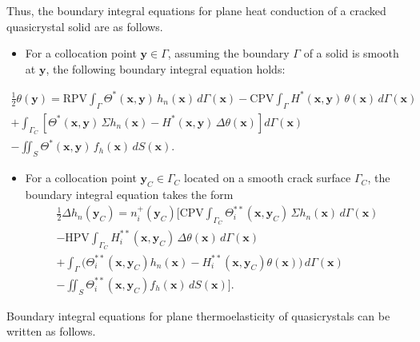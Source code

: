 Thus, the boundary integral equations for plane heat conduction of
a cracked quasicrystal solid are as follows.
\begin{itemize}
	\item For a collocation point $\mathbf{y}\in\Gamma$, assuming the boundary
	$\Gamma$ of a solid is smooth at $\mathbf{y}$, the following boundary
	integral equation holds:
\end{itemize}
\begin{multline}
	\frac{1}{2}\theta(\mathbf{y})
	=
	\mathrm{RPV}\!\int_{\Gamma}
	\Theta^{*}(\mathbf{x},\mathbf{y})\,h_n(\mathbf{x})\,d\Gamma(\mathbf{x})
	-
	\mathrm{CPV}\!\int_{\Gamma}
	H^{*}(\mathbf{x},\mathbf{y})\,\theta(\mathbf{x})\,d\Gamma(\mathbf{x})
	\\
	+
	\int_{\Gamma_C}
	\left[
	\Theta^{*}(\mathbf{x},\mathbf{y})\,\Sigma h_n(\mathbf{x})
	-
	H^{*}(\mathbf{x},\mathbf{y})\,\Delta\theta(\mathbf{x})
	\right] d\Gamma(\mathbf{x})
	\\
	-
	\iint_{S}
	\Theta^{*}(\mathbf{x},\mathbf{y})\,f_h(\mathbf{x})\,dS(\mathbf{x}).
	\label{KushnirEq7}
\end{multline}
\begin{itemize}
	
	\item For a collocation point $\mathbf{y}_{C}\in\Gamma_{C}$ located on
	a smooth crack surface $\Gamma_{C}$, the boundary integral equation
	takes the form
	\begin{multline}
		\frac{1}{2}\Delta h_n(\mathbf{y}_C)
		=
		n_i^{+}(\mathbf{y}_C)
		\bigg[
		\mathrm{CPV}\!\int_{\Gamma_C}
		\Theta_i^{**}(\mathbf{x},\mathbf{y}_C)
		\,\Sigma h_n(\mathbf{x})\,d\Gamma(\mathbf{x})
		\\
		-
		\mathrm{HPV}\!\int_{\Gamma_C}
		H_i^{**}(\mathbf{x},\mathbf{y}_C)
		\,\Delta\theta(\mathbf{x})\,d\Gamma(\mathbf{x})
		\\
		+
		\int_{\Gamma}
		\big(
		\Theta_i^{**}(\mathbf{x},\mathbf{y}_C)h_n(\mathbf{x})
		-
		H_i^{**}(\mathbf{x},\mathbf{y}_C)\theta(\mathbf{x})
		\big)
		\,d\Gamma(\mathbf{x})
		\\
		-
		\iint_{S}
		\Theta_i^{**}(\mathbf{x},\mathbf{y}_C)
		f_h(\mathbf{x})\,dS(\mathbf{x})
		\bigg].
		\label{KushnirEq8}
	\end{multline}
	
\end{itemize}

Boundary integral equations for plane thermoelasticity of quasicrystals
can be written as follows.

